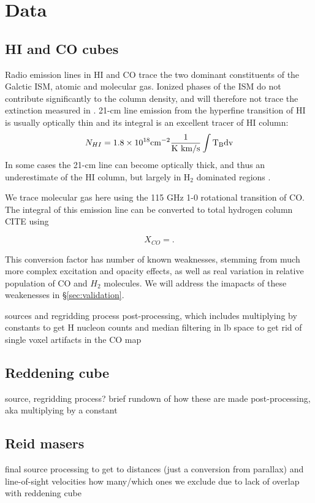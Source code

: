 \section{Data}
\label{sec:data}
\subsection{HI and CO cubes}

Radio emission lines in HI and CO trace the two dominant constituents of the Galctic ISM, atomic and molecular gas. Ionized phases of the ISM do not contribute significantly to the column density, and will therefore not trace the extinction measured in \cite{Green_2015}. 21-cm line emission from the hyperfine transition of HI is usually optically thin and its integral is an excellent tracer of HI column:
\begin{equation}
N_{HI} = 1.8 \times 10^{18} \rm cm^{-2} \frac{1}{\rm K~km/s} \int T_B dv
\end{equation}
In some cases the 21-cm line can become optically thick, and thus an underestimate of the HI column, but largely in H$_2$ dominated regions \cite{Goldsmith_2007}. 

We trace molecular gas here using the 115 GHz 1-0 rotational transition of CO. The integral of this emission line can be converted to total hydrogen column CITE using

\begin{equation}
X_{CO} = .
\end{equation}

This conversion factor has number of known weaknesses, stemming from much more complex excitation and opacity effects, as well as real variation in relative population of CO and $H_2$ molecules. We will address the imapacts of these weakenesses in \S \ref{sec:validation}. 


sources and regridding process
post-processing, which includes multiplying by constants to get H nucleon counts and median filtering in lb space to get rid of single voxel artifacts in the CO map

\subsection{Reddening cube}
source, regridding process?
brief rundown of how these are made
post-processing, aka multiplying by a constant

\subsection{Reid masers}
final source
processing to get to distances (just a conversion from parallax) and line-of-sight velocities
how many/which ones we exclude due to lack of overlap with reddening cube